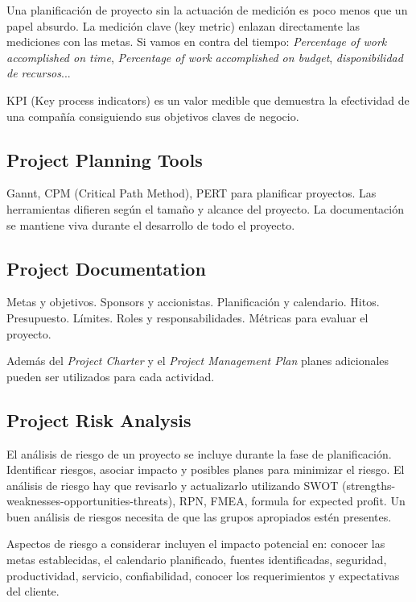 \documentclass[]{article}
\begin{document}
Una planificación de proyecto sin la actuación de medición es poco menos que un papel absurdo. La medición clave (key metric) enlazan directamente las mediciones con las metas. Si vamos en contra del tiempo: \textit{Percentage of work accomplished on time}, \textit{Percentage of work accomplished on budget}, \textit{disponibilidad de recursos}...

KPI (Key process indicators) es un valor medible que demuestra la efectividad de una compañía consiguiendo sus objetivos claves de negocio.

\subsection{Project Planning Tools}

Gannt, CPM (Critical Path Method), PERT para planificar proyectos.
Las herramientas difieren según el tamaño y alcance del proyecto. La documentación se mantiene viva durante el desarrollo de todo el proyecto.

\subsection{Project Documentation}

Metas y objetivos. Sponsors y accionistas. Planificación y calendario. Hitos. Presupuesto. Límites. Roles y responsabilidades. Métricas para evaluar el proyecto.

Además del \textit{Project Charter} y el \textit{Project Management Plan} planes adicionales pueden ser utilizados para cada actividad.

\subsection{Project Risk Analysis}

El análisis de riesgo de un proyecto se incluye durante la fase de planificación. Identificar riesgos, asociar impacto y posibles planes para minimizar el riesgo. El análisis de riesgo hay que revisarlo y actualizarlo utilizando SWOT (strengths-weaknesses-opportunities-threats), RPN, FMEA, formula for expected profit.
Un buen análisis de riesgos necesita de que las grupos apropiados estén presentes.

Aspectos de riesgo a considerar incluyen el impacto potencial en: conocer las metas establecidas, el calendario planificado, fuentes identificadas, seguridad, productividad, servicio, confiabilidad, conocer los requerimientos y expectativas del cliente.
\end{document}
